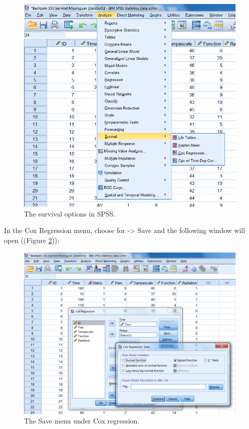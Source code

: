 \documentclass[]{book}
\theoremstyle{definition}
\theoremstyle{definition}
\theoremstyle{definition}
\theoremstyle{remark}
\begin{document}
\begin{figure}

{\centering \includegraphics[width=0.9\linewidth]{images/fig5.5} 

}

\caption{The survival options in SPSS.}\label{fig:fig5-5}
\end{figure}

In the Cox Regression menu, choose for -\textgreater{} Save and the
following window will open ((Figure \ref{fig:fig5-6})):

\begin{figure}

{\centering \includegraphics[width=0.9\linewidth]{images/fig5.6} 

}

\caption{The Save menu under Cox regression.}\label{fig:fig5-6}
\end{figure}
\end{document}
